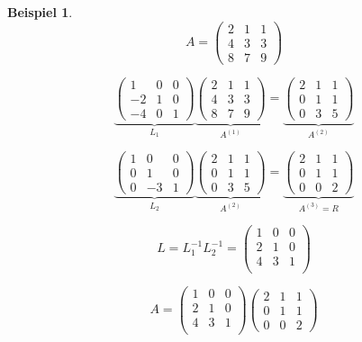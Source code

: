 \documentclass[a4paper,10pt]{scrartcl}
\newtheorem[L]{satz}{Satz}[section]
\newtheorem{bsp}{Beispiel}[section]
\newtheorem[S]{beweis}{Beweis}
\newtheorem[S]{beh}{Behauptung}
\begin{document}
\begin{bsp}
  \[
    A = \begin{pmatrix}
          2 & 1 & 1 \\
          4 & 3 & 3 \\
          8 & 7 & 9
        \end{pmatrix}
  \]

  \[
    \underbrace{\begin{pmatrix}
      1 & 0 & 0 \\
      -2 & 1 & 0 \\
      -4 & 0 & 1
    \end{pmatrix}}_{L_1}
    \underbrace{\begin{pmatrix}
      2 & 1 & 1 \\
      4 & 3 & 3 \\
      8 & 7 & 9
    \end{pmatrix}}_{A^{(1)}}
    =
    \underbrace{\begin{pmatrix}
      2 & 1 & 1 \\
      0 & 1 & 1 \\
      0 & 3 & 5
    \end{pmatrix}}_{A^{(2)}}
  \]

  \[
    \underbrace{\begin{pmatrix}
      1 & 0 & 0 \\
      0 & 1 & 0 \\
      0 & -3 & 1
    \end{pmatrix}}_{L_2}
    \underbrace{\begin{pmatrix}
      2 & 1 & 1 \\
      0 & 1 & 1 \\
      0 & 3 & 5
    \end{pmatrix}}_{A^{(2)}}
    =
    \underbrace{\begin{pmatrix}
      2 & 1 & 1 \\
      0 & 1 & 1 \\
      0 & 0 & 2
    \end{pmatrix}}_{A^{(3)}=R}
  \]

  \[
    L = L_1^{-1} L_2^{-1} =
      \begin{pmatrix}
        1 & 0 & 0 \\
        2 & 1 & 0 \\
        4 & 3 & 1 \\
      \end{pmatrix}
  \]

  \[
    A =
      \begin{pmatrix}
        1 & 0 & 0 \\
        2 & 1 & 0 \\
        4 & 3 & 1 \\
      \end{pmatrix}
      \begin{pmatrix}
        2 & 1 & 1 \\
        0 & 1 & 1 \\
        0 & 0 & 2
      \end{pmatrix}
  \]

\end{bsp}
\end{document}
